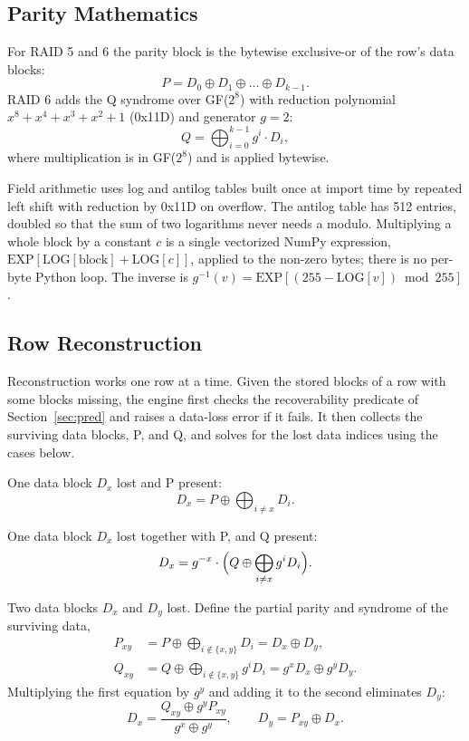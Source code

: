 \documentclass{ieeeaccess}
\begin{document}
\subsection{Parity Mathematics}
For RAID 5 and 6 the parity block is the bytewise exclusive-or of the row's data blocks: \begin{equation} P = D_0 \oplus D_1 \oplus \dots \oplus D_{k-1}. \label{eq:p} \end{equation} RAID 6 adds the Q syndrome over GF($2^8$) with reduction polynomial $x^8+x^4+x^3+x^2+1$ (0x11D) and generator $g = 2$: \begin{equation} Q = \bigoplus_{i=0}^{k-1} g^{i} \cdot D_i , \label{eq:q} \end{equation} where multiplication is in GF($2^8$) and is applied bytewise.

Field arithmetic uses log and antilog tables built once at import time by repeated left shift with reduction by 0x11D on overflow. The antilog table has 512 entries, doubled so that the sum of two logarithms never needs a modulo. Multiplying a whole block by a constant $c$ is a single vectorized NumPy expression, $\mathrm{EXP}[\mathrm{LOG}[\text{block}] + \mathrm{LOG}[c]]$, applied to the non-zero bytes; there is no per-byte Python loop. The inverse is $g^{-1}(v) = \mathrm{EXP}[(255 - \mathrm{LOG}[v]) \bmod 255]$.

\subsection{Row Reconstruction}
Reconstruction works one row at a time. Given the stored blocks of a row with some blocks missing, the engine first checks the recoverability predicate of Section~\ref{sec:pred} and raises a data-loss error if it fails. It then collects the surviving data blocks, P, and Q, and solves for the lost data indices using the cases below.

One data block $D_x$ lost and P present: \begin{equation} D_x = P \oplus \bigoplus_{i \ne x} D_i . \label{eq:rec1} \end{equation}

One data block $D_x$ lost together with P, and Q present: \begin{equation} D_x = g^{-x} \cdot \Bigl( Q \oplus \bigoplus_{i \ne x} g^{i} D_i \Bigr). \label{eq:rec2} \end{equation}

Two data blocks $D_x$ and $D_y$ lost. Define the partial parity and syndrome of the surviving data, \begin{align} P_{xy} &= P \oplus \bigoplus_{i \notin \{x,y\}} D_i = D_x \oplus D_y, \\ Q_{xy} &= Q \oplus \bigoplus_{i \notin \{x,y\}} g^{i} D_i = g^{x} D_x \oplus g^{y} D_y . \end{align} Multiplying the first equation by $g^{y}$ and adding it to the second eliminates $D_y$: \begin{equation} D_x = \frac{Q_{xy} \oplus g^{y} P_{xy}}{g^{x} \oplus g^{y}}, \qquad D_y = P_{xy} \oplus D_x . \label{eq:rec3} \end{equation}
\end{document}
